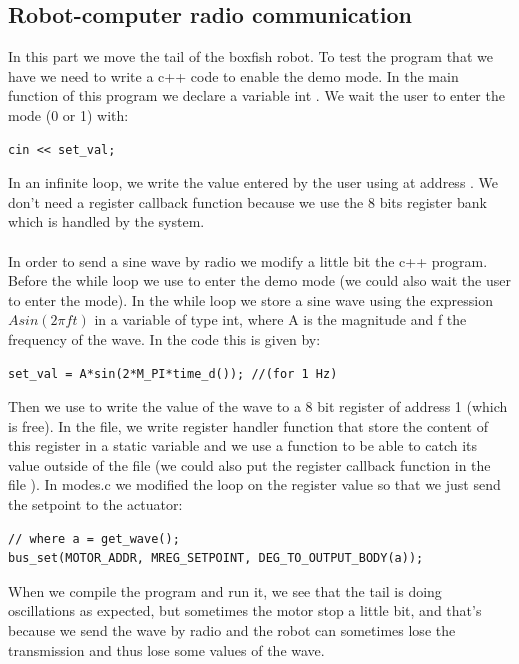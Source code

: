 \documentclass[11pt]{article}
\begin{document}
\subsection{Robot-computer radio communication}

In this part we move the tail of the boxfish robot. To test the program that we have we need to write a c++ code to enable the demo mode. In the main function of this program we declare a variable int . We wait the user to enter the mode (0 or 1) with:
\begin{verbatim}
cin << set_val;
\end{verbatim}
In an infinite loop, we write the value entered by the user using  at address . We don't need a register callback function because we use the 8 bits register bank which is handled by the system.
\\
\\
In order to send a sine wave by radio we modify a little bit the c++ program. Before the while loop we use  to enter the demo mode (we could also wait the user to enter the mode). In the while loop we store a sine wave using the expression ${Asin(2{\pi}ft)}$ in a variable  of type int, where A is the magnitude and f the frequency of the wave. In the code this is given by:
\begin{verbatim}
set_val = A*sin(2*M_PI*time_d()); //(for 1 Hz)
\end{verbatim}
Then we use  to write the value of the wave to a 8 bit register of address 1 (which is free). In the  file, we write register handler function that store the content of this register in a static variable and we use a function  to be able to catch its value outside of the file (we could also put the register callback function in the file ). In modes.c we modified the loop on the  register value so that we just send the setpoint to the actuator:
\begin{verbatim}
// where a = get_wave();
bus_set(MOTOR_ADDR, MREG_SETPOINT, DEG_TO_OUTPUT_BODY(a));
\end{verbatim}
When we compile the program and run it, we see that the tail is doing oscillations as expected, but sometimes the motor stop a little bit, and that's because we send the wave by radio and the robot can sometimes lose the transmission and thus lose some values of the wave.
\end{document}
